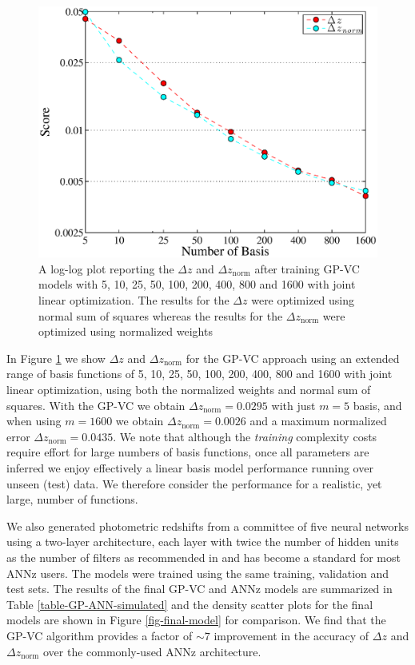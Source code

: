 \documentclass[useAMS,usenatbib,fleqn]{mn2e}
\begin{document}
\begin{figure}
       \centering
       \includegraphics[width=\columnwidth]{figures/1600.eps}
        \caption{A log-log plot reporting the $\Delta z$ and $\Delta z_\textrm{norm}$ after training GP-VC models with 5, 10, 25, 50, 100, 200, 400, 800 and 1600 with joint linear optimization. The results for the $\Delta z$ were optimized using normal sum of squares whereas the results for the $\Delta z_\textrm{norm}$ were optimized using normalized weights}
       \label{fig-1600}
\end{figure}

In Figure \ref{fig-1600} we show $\Delta z$ and $\Delta z_\textrm{norm}$ for the GP-VC approach using an extended range of basis functions of 5, 10, 25, 50, 100, 200, 400, 800 and 1600 with joint linear optimization, using both the normalized weights and normal sum of squares. With the GP-VC we obtain $\Delta z_\textrm{norm} = 0.0295$ with just $m=5$ basis, and when using $m=1600$ we obtain $\Delta z_\textrm{norm} = 0.0026$ and  a maximum normalized error $\Delta z_\textrm{norm} = 0.0435$. We note that although the \emph{training} complexity costs require effort for large numbers of basis functions, once all parameters are inferred we enjoy effectively a linear basis model performance running over unseen (test) data. We therefore consider the performance for a realistic, yet large, number of functions. 

We also generated photometric redshifts from a committee of five neural networks using a two-layer architecture, each layer with twice the number of hidden units as the number of filters as recommended in \cite{Collister04} and has become a standard for most {\sc ANNz} users. The models were trained using the same training, validation and test sets. The results of the final GP-VC and {\sc ANNz} models are summarized in Table \ref{table-GP-ANN-simulated} and the density scatter plots for the final models are shown in Figure \ref{fig-final-model} for comparison. We find that the GP-VC algorithm provides a factor of $\sim 7$ improvement in the accuracy of $\Delta z$ and $\Delta z_\textrm{norm}$ over the commonly-used {\sc ANNz} architecture.
\end{document}
